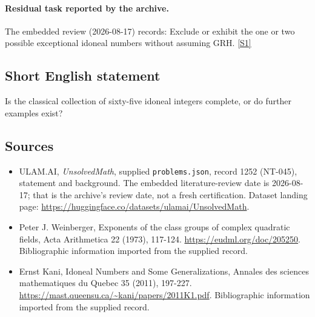 \documentclass[11pt,a4paper]{article}
\newcommand{\sref}[2]{\hyperlink{source:#1:#2}{[S#2]}}
\begin{document}
\paragraph{Residual task reported by the archive.}

The embedded review (2026-08-17) records: Exclude or exhibit the one or two possible exceptional idoneal numbers without assuming GRH. \sref{1252}{1}

\subsection{Short English statement}

Is the classical collection of sixty-five idoneal integers complete, or do further examples exist?

\subsection{Sources}

{\small

\begin{itemize}

\item[\hypertarget{source:1252:1}{S1}] ULAM.AI, \emph{UnsolvedMath}, supplied \texttt{problems.json}, record 1252 (NT-045), statement and background. The embedded literature-review date is 2026-08-17; that is the archive’s review date, not a fresh certification. Dataset landing page: \url{https://huggingface.co/datasets/ulamai/UnsolvedMath}.

\item[\hypertarget{source:1252:2}{S2}] Peter J. Weinberger, Exponents of the class groups of complex quadratic fields, Acta Arithmetica 22 (1973), 117-124. \url{https://eudml.org/doc/205250}. Bibliographic information imported from the supplied record.

\item[\hypertarget{source:1252:3}{S3}] Ernst Kani, Idoneal Numbers and Some Generalizations, Annales des sciences mathematiques du Quebec 35 (2011), 197-227. \url{https://mast.queensu.ca/~kani/papers/2011K1.pdf}. Bibliographic information imported from the supplied record.

\end{itemize}

}

\label{end:1252}
\end{document}
